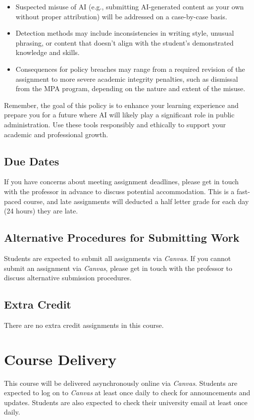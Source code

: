 \documentclass[11pt, letterpaper]{article}
\begin{document}
\begin{itemize}
    \item Suspected misuse of AI (e.g., submitting AI-generated content as your own without proper attribution) will be addressed on a case-by-case basis.
    \item Detection methods may include inconsistencies in writing style, unusual phrasing, or content that doesn't align with the student's demonstrated knowledge and skills.
    \item Consequences for policy breaches may range from a required revision of the assignment to more severe academic integrity penalties, such as dismissal from the MPA program, depending on the nature and extent of the misuse.
\end{itemize}
\noindent Remember, the goal of this policy is to enhance your learning experience and prepare you for a future where AI will likely play a significant role in public administration. Use these tools responsibly and ethically to support your academic and professional growth.

\subsection*{Due Dates}
If you have concerns about meeting assignment deadlines, please get in touch with the professor in advance to discuss potential accommodation. This is a fast-paced course, and late assignments will deducted a half letter grade for each day (24 hours) they are late.

\subsection*{Alternative Procedures for Submitting Work}
Students are expected to submit all assignments via \emph{Canvas}. If you cannot submit an assignment via \emph{Canvas}, please get in touch with the professor to discuss alternative submission procedures.

\subsection*{Extra Credit}
There are no extra credit assignments in this course. 

\section*{Course Delivery}

This course will be delivered asynchronously online via \emph{Canvas}. Students are expected to log on to \emph{Canvas} at least once daily to check for announcements and updates. Students are also expected to check their university email at least once daily.
\end{document}
